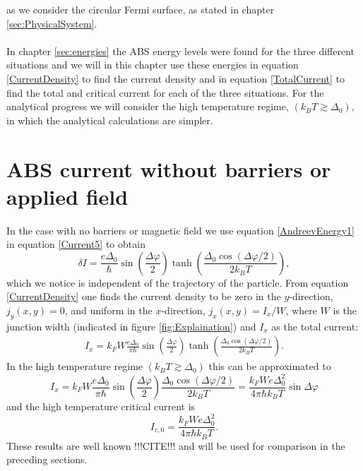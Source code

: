as we consider the circular Fermi surface, as stated in chapter \ref{sec:PhysicalSystem}.
\\
\\
In chapter \ref{sec:energies} the ABS energy levels were found for the three different situations and we will in this chapter use these energies in equation \eqref{CurrentDensity} to find the current density and in equation \eqref{TotalCurrent} to find the total and critical current for each of the three situations. For the analytical progress we will consider the high temperature regime, $(k_BT \gtrsim \Delta_0)$, in which the analytical calculations are simpler.

\section{ABS current without barriers or applied field}
\label{sec:CurrentWithout}
In the case with no barriers or magnetic field we use equation \eqref{AndreevEnergy1} in equation \eqref{Current5} to obtain
\begin{equation}
    \delta I = \frac{e\Delta_0}{\hbar}\sin\left(\frac{\Delta\varphi}{2}\right)\tanh\left(\frac{\Delta_0\cos(\Delta\varphi/2)}{2k_BT}\right),
\end{equation}
which we notice is independent of the trajectory of the particle. From equation \eqref{CurrentDensity} one finds the current density to be zero in the $y$-direction, $j_y(x,y) = 0$, and uniform in the $x$-direction, $j_x(x,y) = I_x/W$, where $W$ is the junction width (indicated in figure \ref{fig:Explaination}) and $I_x$ as the total current:
\begin{equation}
\begin{split}
   I_x = k_F W\frac{e\Delta_0}{\pi \hbar} \sin\left(\frac{\Delta\varphi}{2}\right)\tanh\left(\frac{\Delta_0\cos(\Delta\varphi/2)}{2k_BT}\right).
\end{split}
\label{TotalCurrent}
\end{equation}
In the high temperature regime $(k_BT \gtrsim \Delta_0)$ this can be approximated to
\begin{equation}
    I_x = k_F W\frac{e\Delta_0}{\pi \hbar} \sin\left(\frac{\Delta\varphi}{2}\right)\frac{\Delta_0\cos(\Delta\varphi/2)}{2k_BT} =\frac{ k_F W e\Delta_0^2}{4\pi \hbar k_BT}\sin \Delta \varphi
\end{equation}
and the high temperature critical current is
\begin{equation}
    I_{c,0} = \frac{k_F W e\Delta_0^2}{4\pi \hbar k_BT}.
\label{Ic0-highT}
\end{equation}
These results are well known !!!CITE!!! and will be used for comparison in the preceding sections. 

